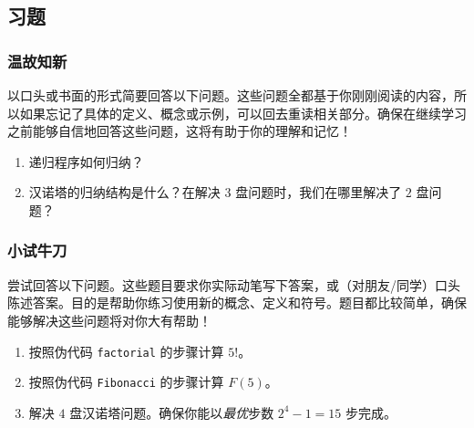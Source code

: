 \subsection{习题}

\subsubsection*{温故知新}

以口头或书面的形式简要回答以下问题。这些问题全都基于你刚刚阅读的内容，所以如果忘记了具体的定义、概念或示例，可以回去重读相关部分。确保在继续学习之前能够自信地回答这些问题，这将有助于你的理解和记忆！

\begin{enumerate}[label=(\arabic*)]
    \item 递归程序如何归纳？
    \item 汉诺塔的归纳结构是什么？在解决 $3$ 盘问题时，我们在哪里解决了 $2$ 盘问题？
\end{enumerate}

\subsubsection*{小试牛刀}

尝试回答以下问题。这些题目要求你实际动笔写下答案，或（对朋友/同学）口头陈述答案。目的是帮助你练习使用新的概念、定义和符号。题目都比较简单，确保能够解决这些问题将对你大有帮助！

\begin{enumerate}[label=(\arabic*)]
    \item 按照伪代码 \verb|factorial| 的步骤计算 $5!$。
    \item 按照伪代码 \verb|Fibonacci| 的步骤计算 $F(5)$。
    \item 解决 $4$ 盘汉诺塔问题。确保你能以\emph{最优}步数 $2^4 - 1 = 15$ 步完成。
\end{enumerate}